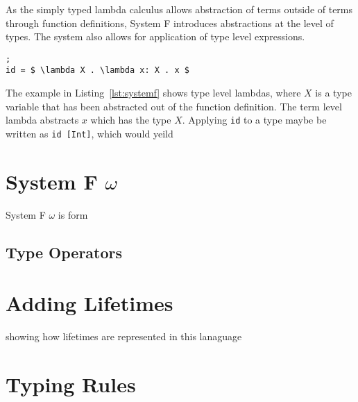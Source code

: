As the simply typed lambda calculus allows abstraction of terms outside of
terms through function definitions, System F introduces abstractions at the
level of types. The system also allows for application of type level
expressions.

\begin{lstlisting}[mathescape, caption={Polymorphic identity function showing type level abstraction.}, label={lst:systemf}];
id = $ \lambda X . \lambda x: X . x $
\end{lstlisting}

The example in Listing~\ref{lst:systemf} shows type level lambdas, where $ X $
is a type variable that has been abstracted out of the function definition. The
term level lambda abstracts $ x $ which has the type $ X $. Applying \lstinline{id}
to a type maybe be written as \lstinline[mathescape]{id [Int]}, which would
yeild 

\section{System F $\omega$}
System F $\omega$ is form

\subsection{Type Operators}

\section{Adding Lifetimes}
showing how lifetimes are represented in this lanaguage

\section{Typing Rules}

